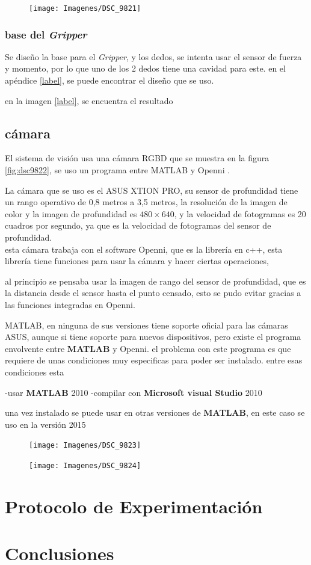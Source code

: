 \begin{figure}
	\centering
	\texttt{[image: Imagenes/DSC\_9821]}
	\caption{}
	\label{fig:dsc9821}
\end{figure}

\subsubsection{base del \textit{Gripper}}
Se diseño la base para el \textit{Gripper}, y los dedos, se intenta usar el sensor de fuerza y momento, por lo que uno de los 2 dedos tiene una cavidad para este. en el apéndice \ref{label}, se puede encontrar el diseño que se uso.

en la imagen \ref{label}, se encuentra el resultado




\subsection{cámara}

El sistema de visión usa una cámara RGBD que se muestra en la figura \ref{fig:dsc9822}, se uso un programa entre MATLAB y Openni \cite{matlabwrapper}.

La cámara que se uso es el ASUS XTION PRO, su sensor de profundidad tiene un rango operativo de 0,8 metros a 3,5 metros, la resolución de la imagen de color y la imagen de profundidad es $480 \times640$, y la velocidad de fotogramas es 20 cuadros por segundo, ya que es la velocidad de fotogramas del sensor de profundidad. \\

esta cámara trabaja con el software Openni, que es la librería en c++, esta librería tiene funciones para usar la cámara y hacer ciertas operaciones,

al principio se pensaba usar la imagen de rango del sensor de profundidad, que es la distancia desde el sensor hasta el punto censado, esto se pudo evitar gracias a las funciones integradas en Openni.

MATLAB, en ninguna de sus versiones tiene soporte oficial para las cámaras ASUS, aunque si tiene soporte para nuevos dispositivos, pero existe el programa envolvente entre \textbf{MATLAB} y Openni.
el problema con este programa es que requiere de unas condiciones muy especificas para poder ser instalado. entre esas condiciones esta

-usar \textbf{MATLAB} 2010
-compilar con \textbf{Microsoft visual Studio} 2010


una vez instalado se puede usar en otras versiones de \textbf{MATLAB}, en este caso se uso en la versión 2015


\begin{figure}
	\centering
	\texttt{[image: Imagenes/DSC\_9823]}
	\caption{}
	\label{fig:dsc9823}
\end{figure}
\begin{figure}
	\centering
	\texttt{[image: Imagenes/DSC\_9824]}
	\caption{}
	\label{fig:dsc9824}
\end{figure}


\section{Protocolo de Experimentación}

\section{Conclusiones}


